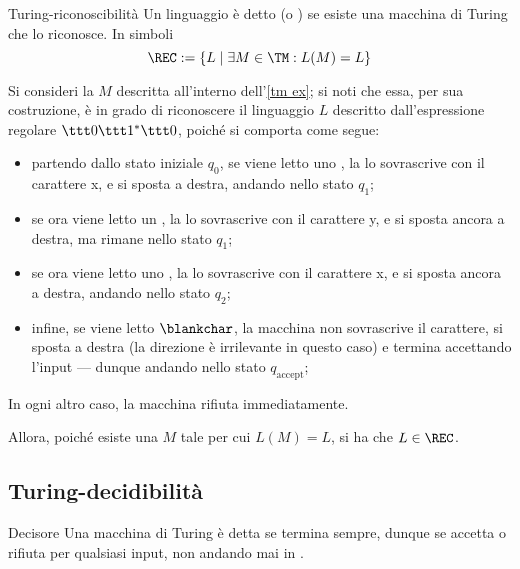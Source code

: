 \documentclass[a4paper, 12pt]{report}
\begin{document}
    \begin{frameddefn}{Turing-riconoscibilità}
        Un linguaggio è detto  (o ) se esiste una macchina di Turing che lo riconosce. In simboli $$\REC := \{L \mid \exists M \in \TM : L(M) = L\}$$
    \end{frameddefn}

    \begin{example}
        Si consideri la \TM $M$ descritta all'interno dell'\cref{tm ex}; si noti che essa, per sua costruzione, è in grado di riconoscere il linguaggio $L$ descritto dall'espressione regolare $\ttt 0 \ttt 1^* \ttt 0$, poiché si comporta come segue:

        \begin{itemize}
            \item partendo dallo stato iniziale $q_0$, se viene letto uno , la \TM lo sovrascrive con il carattere \ttt x, e si sposta a destra, andando nello stato $q_1$;
            \item se ora viene letto un , la \TM lo sovrascrive con il carattere \ttt y, e si sposta ancora a destra, ma rimane nello stato $q_1$;
            \item se ora viene letto uno , la \TM lo sovrascrive con il carattere \ttt x, e si sposta ancora a destra, andando nello stato $q_2$;
            \item infine, se viene letto $\blankchar$, la macchina non sovrascrive il carattere, si sposta a destra (la direzione è irrilevante in questo caso) e termina accettando l'input --- dunque andando nello stato $q_\mathrm{accept}$;
        \end{itemize}

        In ogni altro caso, la macchina rifiuta immediatamente.

        Allora, poiché esiste una \TM $M$ tale per cui $L(M) = L$, si ha che $L \in \mathrm{\REC}$.
    \end{example}

    \subsection{Turing-decidibilità}

    \begin{frameddefn}{Decisore}
        Una macchina di Turing è detta  se termina sempre, dunque se accetta o rifiuta per qualsiasi input, non andando mai in .
    \end{frameddefn}
\end{document}
